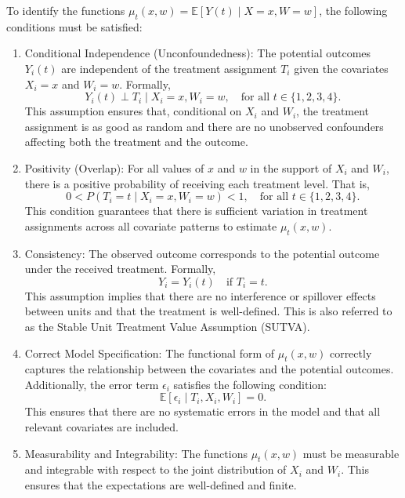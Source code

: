\documentclass{article}
\begin{document}
To identify the functions \( \mu_t(x, w) = \mathbb{E}[Y(t) \mid X = x, W = w] \), the following conditions must be satisfied:

\begin{enumerate}
    \item Conditional Independence (Unconfoundedness): The potential outcomes \( Y_i(t) \) are independent of the treatment assignment \( T_i \) given the covariates \( X_i = x \) and \( W_i = w \). Formally,
    \[
    Y_i(t) \perp T_i \mid X_i = x, W_i = w, \quad \text{for all } t \in \{1,2,3,4\}.
    \]
    This assumption ensures that, conditional on \( X_i \) and \( W_i \), the treatment assignment is as good as random and there are no unobserved confounders affecting both the treatment and the outcome.

    \item Positivity (Overlap): For all values of \( x \) and \( w \) in the support of \( X_i \) and \( W_i \), there is a positive probability of receiving each treatment level. That is,
    \[
    0 < P(T_i = t \mid X_i = x, W_i = w) < 1, \quad \text{for all } t \in \{1,2,3,4\}.
    \]
    This condition guarantees that there is sufficient variation in treatment assignments across all covariate patterns to estimate \( \mu_t(x, w) \).

    \item Consistency: The observed outcome corresponds to the potential outcome under the received treatment. Formally,
    \[
    Y_i = Y_i(t) \quad \text{if } T_i = t.
    \]
    This assumption implies that there are no interference or spillover effects between units and that the treatment is well-defined. This is also referred to as the Stable Unit Treatment Value Assumption (SUTVA).

    \item Correct Model Specification: The functional form of \( \mu_t(x, w) \) correctly captures the relationship between the covariates and the potential outcomes. Additionally, the error term \( \epsilon_i \) satisfies the following condition:
    \[
    \mathbb{E}[\epsilon_i \mid T_i, X_i, W_i] = 0.
    \]
    This ensures that there are no systematic errors in the model and that all relevant covariates are included.

    \item Measurability and Integrability: The functions \( \mu_t(x, w) \) must be measurable and integrable with respect to the joint distribution of \( X_i \) and \( W_i \). This ensures that the expectations are well-defined and finite.
\end{enumerate}
\end{document}
